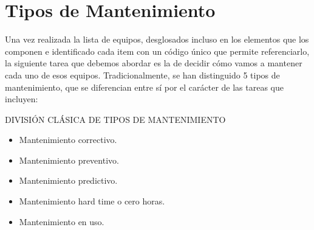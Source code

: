 \section{Tipos de Mantenimiento}

Una vez realizada la lista de equipos, desglosados incluso en los elementos que los componen e identificado cada item con un código único que
permite referenciarlo, la siguiente tarea que debemos abordar es la de decidir
cómo vamos a mantener cada uno de esos equipos.
Tradicionalmente, se han distinguido 5 tipos de mantenimiento, que se diferencian entre sí por el carácter de las tareas que incluyen:

\begin{tcolorbox}[]
DIVISIÓN CLÁSICA DE TIPOS DE MANTENIMIENTO
\tcblower
\begin{itemize}
\item Mantenimiento correctivo.
\item Mantenimiento preventivo.
\item Mantenimiento predictivo.
\item Mantenimiento hard time o cero horas.
\item Mantenimiento en uso.
\end{itemize}
\end{tcolorbox}

